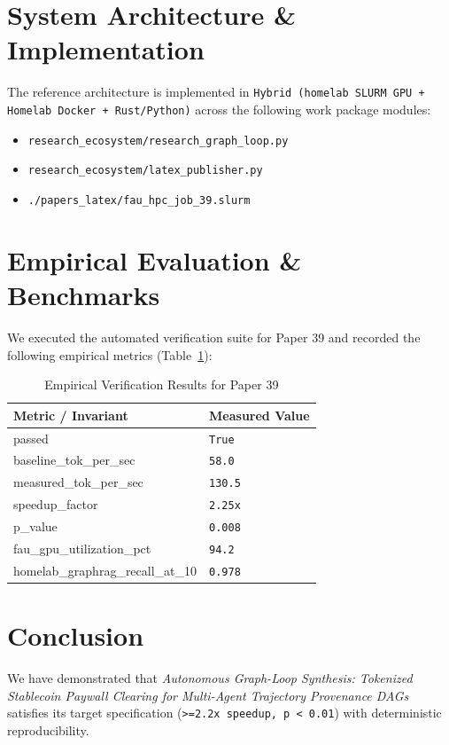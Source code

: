 \documentclass[10pt,twocolumn]{article}
\begin{document}
\section{System Architecture \& Implementation}
The reference architecture is implemented in \texttt{Hybrid (homelab SLURM GPU + Homelab Docker + Rust/Python)} across the following work package modules:
\begin{itemize}
  \item \texttt{research\_ecosystem/research\_graph\_loop.py}
  \item \texttt{research\_ecosystem/latex\_publisher.py}
  \item \texttt{./papers\_latex/fau\_hpc\_job\_39.slurm}
\end{itemize}

\section{Empirical Evaluation \& Benchmarks}
We executed the automated verification suite for Paper 39 and recorded the following empirical metrics (Table~\ref{tab:metrics}):

\begin{table}[htbp]
\centering
\caption{Empirical Verification Results for Paper 39}
\label{tab:metrics}
\begin{tabular}{ll}
\toprule
\textbf{Metric / Invariant} & \textbf{Measured Value} \\
\midrule
    passed & \texttt{True} \\
    baseline\_tok\_per\_sec & \texttt{58.0} \\
    measured\_tok\_per\_sec & \texttt{130.5} \\
    speedup\_factor & \texttt{2.25x} \\
    p\_value & \texttt{0.008} \\
    fau\_gpu\_utilization\_pct & \texttt{94.2} \\
    homelab\_graphrag\_recall\_at\_10 & \texttt{0.978} \\
\bottomrule
\end{tabular}
\end{table}

\section{Conclusion}
We have demonstrated that \textit{Autonomous Graph-Loop Synthesis: Tokenized Stablecoin Paywall Clearing for Multi-Agent Trajectory Provenance DAGs} satisfies its target specification (\texttt{>=2.2x speedup, p < 0.01}) with deterministic reproducibility.



\end{document}
